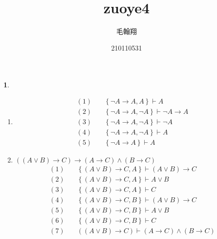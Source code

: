 \documentclass[a4paper, 12pt]{ctexbook} %
\title{zuoye4}
\author{毛翰翔 \and 210110531}
\theoremstyle{plain}
\theoremstyle{definition}
\newtheorem{problem}{}
\theoremstyle{remark}
\begin{document}
\maketitle
\begin{problem}
\begin{enumerate}
\item 
\begin{align*}
    (1)\quad &\left\{ \neg A \to A  , A    \right\} \vdash  A \tag{$\in$} \\
    (2)\quad &\left\{\neg A \to A ,  \neg A \right\} \vdash \neg A \to A \tag{$\in$}\\
    (3)\quad &\left\{ \neg A \to  A , \neg A  \right\} \vdash  \neg A \tag{$\in$}\\
    (4)\quad &\left\{ \neg A \to A , \neg A \right\} \vdash   A \tag{$\rightarrow -$} \\
    (5)\quad &\left\{ \neg A \to A \right\} \vdash  A \tag{(1)(4) $-$}
\end{align*}
\item 
$ (\left(A \vee  B \right) \to  C ) \to \left(A \to C \right) \wedge \left(B \to C\right)$ 
\begin{align*}
    (1)\quad &\left\{ \left(A \vee B \right) \to C , A     \right\} \vdash  \left(A \vee B \right)  \to C \tag{$\in$}\\
    (2)\quad &\left\{\left(A \vee B \right) \to C  , A   \right\} \vdash  A \vee B \tag{$\vee + $} \\
    (3)\quad &\left\{ \left(A \vee B \right) \to C , A \right\} \vdash  C \tag{$\rightarrow  - $} \\
    (4)\quad &\left\{ \left(A \vee B \right) \to C , B     \right\} \vdash  \left(A \vee B \right)  \to C \tag{$\in$}\\ 
    (5)\quad &\left\{\left(A \vee B \right) \to C  , B   \right\} \vdash  A \vee B \tag{$\vee + $} \\
    (6)\quad &\left\{ \left(A \vee B \right) \to C , B \right\} \vdash  C \tag{$\rightarrow  - $} \\
(7)\quad &(\left(A \vee  B \right) \to  C ) \vdash \left(A \to C \right) \wedge \left(B \to C\right)
\end{align*}


\end{enumerate}
\end{problem}
\end{document}
